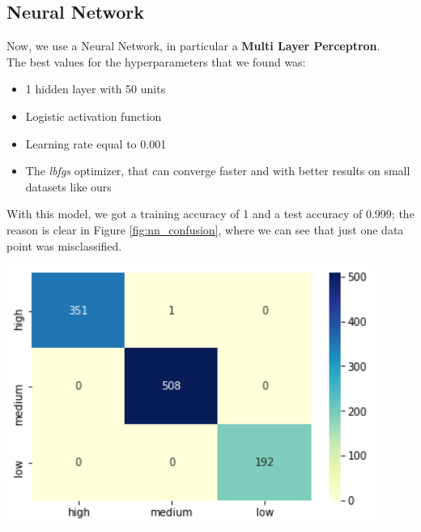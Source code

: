 \subsection{Neural Network}
\begin{minipage}{0.59\textwidth}
Now, we use a Neural Network, in particular a \textbf{Multi Layer Perceptron}.\\
The best values for the hyperparameters that we found was:
\begin{itemize}
\item 1 hidden layer with 50 units
\item Logistic activation function
\item Learning rate equal to 0.001
\item The \emph{lbfgs} optimizer, that can converge faster and with better results on small datasets like ours
\end{itemize}

With this model, we got a training accuracy of 1 and a test accuracy of 0.999; the reason is clear in Figure \ref{fig:nn_confusion}, where we can see that just one data point was misclassified.
\end{minipage}
\begin{minipage}{0.4\textwidth}
\centering
\includegraphics[width=0.90\textwidth]{img/nn_confusion.png}
\captionsetup{justification=centering}
\label{fig:nn_confusion}
\end{minipage}

